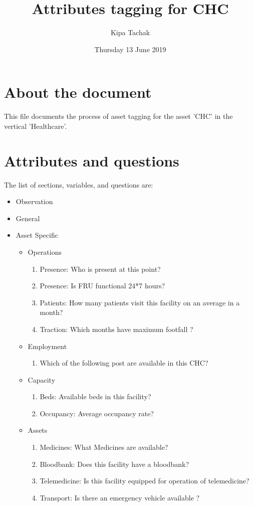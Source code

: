 \documentclass[oneside]{article}
\title{Attributes tagging for CHC}
\author{Kipa Tachak}
\date{Thursday 13 June 2019}
\begin{document}
\maketitle

\section{About the document}
This file documents the process of asset tagging for the asset 'CHC' in the
vertical 'Healthcare'.

\section{Attributes and questions}
The list of sections, variables, and questions are:
    \begin{itemize}
    \item Observation
    \item General
    \item Asset Specific
    \begin{itemize}
\item Operations
\begin{enumerate}
\item Presence: Who is present at this point?
\item Presence: Is FRU functional 24*7 hours?
\item Patients: How many patients visit this facility on an average in a month?
\item Traction: Which months have maximum footfall ?
\end{enumerate}

\item Employment
\begin{enumerate}
\item  Which of the following post are available in this CHC?
\end{enumerate}

\item Capacity
\begin{enumerate}
\item Beds: Available beds in this facility?
\item Occupancy: Average occupancy rate?
\end{enumerate}

\item Assets
\begin{enumerate}
\item Medicines: What Medicines are available?
\item Bloodbank: Does this facility have a bloodbank?
\item Telemedicine: Is this facility equipped for operation of telemedicine?
\item Transport: Is there an emergency vehicle available ?
\end{enumerate}


\end{itemize}
\end{itemize}
\end{document}
